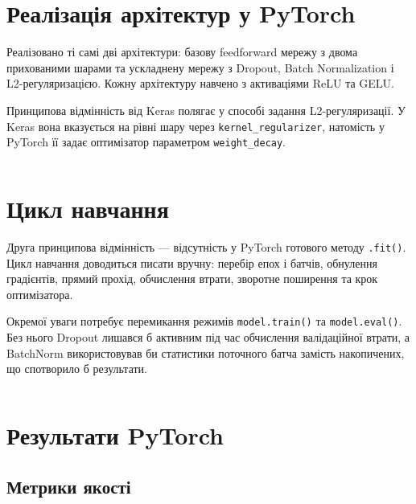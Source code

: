 \documentclass[14pt,a4paper]{extreport}
\begin{document}
\section{Реалізація архітектур у PyTorch}

Реалізовано ті самі дві архітектури: базову feedforward мережу з двома прихованими шарами та ускладнену мережу з Dropout, Batch Normalization і L2-регуляризацією. Кожну архітектуру навчено з активаціями ReLU та GELU.

Принципова відмінність від Keras полягає у способі задання L2-регуляризації. У Keras вона вказується на рівні шару через \texttt{kernel\_regularizer}, натомість у PyTorch її задає оптимізатор параметром \texttt{weight\_decay}.

\begin{listing}[H]
\inputminted[firstline=26,lastline=52]{python}{../src/aiit/torch_models.py}
\caption{Архітектури моделей у PyTorch (\texttt{src/torch\_models.py})}
\label{lst:ptmodels}
\end{listing}

\section{Цикл навчання}

Друга принципова відмінність --- відсутність у PyTorch готового методу \texttt{.fit()}. Цикл навчання доводиться писати вручну: перебір епох і батчів, обнулення градієнтів, прямий прохід, обчислення втрати, зворотне поширення та крок оптимізатора.

Окремої уваги потребує перемикання режимів \texttt{model.train()} та \texttt{model.eval()}. Без нього Dropout лишався б активним під час обчислення валідаційної втрати, а BatchNorm використовував би статистики поточного батча замість накопичених, що спотворило б результати.

\begin{listing}[H]
\inputminted[firstline=57,lastline=89]{python}{../src/aiit/run_lab2.py}
\caption{Ручний цикл навчання у PyTorch (\texttt{src/run\_lab2.py})}
\label{lst:ptloop}
\end{listing}

\section{Результати PyTorch}

\subsection{Метрики якості}
\end{document}

